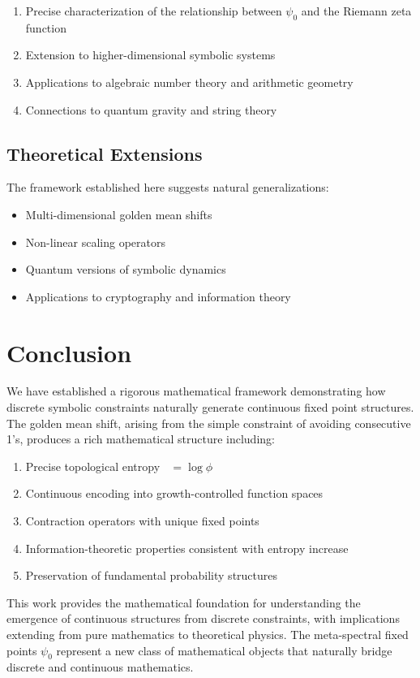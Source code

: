 \documentclass[12pt]{article}
\theoremstyle{plain}
\theoremstyle{definition}
\DeclareMathOperator{\htop}{h_{top}}
\begin{document}
\begin{enumerate}
\item Precise characterization of the relationship between $\psi_0$ and the Riemann zeta function
\item Extension to higher-dimensional symbolic systems
\item Applications to algebraic number theory and arithmetic geometry
\item Connections to quantum gravity and string theory
\end{enumerate}

\subsection{Theoretical Extensions}

The framework established here suggests natural generalizations:
\begin{itemize}
\item Multi-dimensional golden mean shifts
\item Non-linear scaling operators
\item Quantum versions of symbolic dynamics
\item Applications to cryptography and information theory
\end{itemize}

\section{Conclusion}

We have established a rigorous mathematical framework demonstrating how discrete symbolic constraints naturally generate continuous fixed point structures. The golden mean shift, arising from the simple constraint of avoiding consecutive 1's, produces a rich mathematical structure including:

\begin{enumerate}
\item Precise topological entropy $\htop = \log \phi$
\item Continuous encoding into growth-controlled function spaces
\item Contraction operators with unique fixed points
\item Information-theoretic properties consistent with entropy increase
\item Preservation of fundamental probability structures
\end{enumerate}

This work provides the mathematical foundation for understanding the emergence of continuous structures from discrete constraints, with implications extending from pure mathematics to theoretical physics. The meta-spectral fixed points $\psi_0$ represent a new class of mathematical objects that naturally bridge discrete and continuous mathematics.
\end{document}
